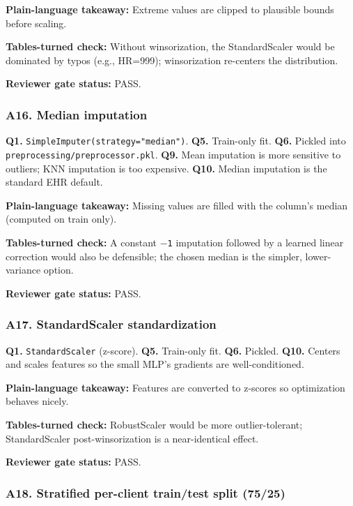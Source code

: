 \documentclass{article}
\begin{document}
\textbf{Plain-language takeaway:} Extreme values are clipped to plausible bounds before scaling.


\textbf{Tables-turned check:} Without winsorization, the StandardScaler would be dominated by typos (e.g., HR=999); winsorization re-centers the distribution.


\textbf{Reviewer gate status:} PASS.


\subsubsection{A16. Median imputation}


\textbf{Q1.} \texttt{SimpleImputer(strategy="median")}. \textbf{Q5.} Train-only fit. \textbf{Q6.} Pickled into \texttt{preprocessing/preprocessor.pkl}. \textbf{Q9.} Mean imputation is more sensitive to outliers; KNN imputation is too expensive. \textbf{Q10.} Median imputation is the standard EHR default.


\textbf{Plain-language takeaway:} Missing values are filled with the column's median (computed on train only).


\textbf{Tables-turned check:} A constant \texttt{\ensuremath{-}1} imputation followed by a learned linear correction would also be defensible; the chosen median is the simpler, lower-variance option.


\textbf{Reviewer gate status:} PASS.


\subsubsection{A17. StandardScaler standardization}


\textbf{Q1.} \texttt{StandardScaler} (z-score). \textbf{Q5.} Train-only fit. \textbf{Q6.} Pickled. \textbf{Q10.} Centers and scales features so the small MLP's gradients are well-conditioned.


\textbf{Plain-language takeaway:} Features are converted to z-scores so optimization behaves nicely.


\textbf{Tables-turned check:} RobustScaler would be more outlier-tolerant; StandardScaler post-winsorization is a near-identical effect.


\textbf{Reviewer gate status:} PASS.


\subsubsection{A18. Stratified per-client train/test split (75/25)}
\end{document}
